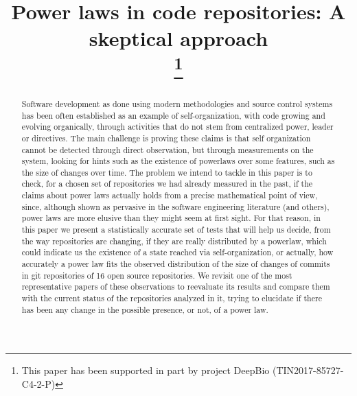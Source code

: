 \documentclass[conference]{IEEEtran}
\begin{document}
\title{Power laws in code repositories: A skeptical approach\\
	\thanks{This paper has been supported in part by
		project DeepBio (TIN2017-85727-C4-2-P)}
}

\author{
	\and
}

\maketitle

\begin{abstract}
  
Software development as done using modern methodologies and source
control systems has been often established as an example of
self-organization, with code growing and evolving organically, through
activities that do not stem from centralized power, leader or
directives.  The main challenge is proving these claims is that self
organization cannot be detected through direct observation, but
through measurements on the system, looking for hints such as the
existence of powerlaws over some features, such as the size of changes
over time.  The problem we intend to tackle in this paper is to check,
for a chosen set of repositories we had already measured in the past,
if the claims about power laws actually holds from a precise
mathematical point of view, since, although shown as pervasive in the
software engineering literature (and others), power laws are more
elusive than they might seem at first sight. For that reason, in this
paper we present a statistically accurate set of tests that will help
us decide, from the way repositories are changing, if they are really
distributed by a powerlaw, which could indicate us the existence of a
state reached via self-organization, or actually, how accurately a
power law fits the observed distribution of the size of changes of
commits in git repositories of 16 open source repositories.  We
revisit one of the most representative papers of these observations to
reevaluate its results and compare them with the current status of the
repositories analyzed in it, trying to elucidate if there has been any
change in the possible presence, or not, of a power law.


\end{abstract}
\end{document}
